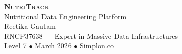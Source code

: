 \documentclass[aspectratio=169, 10pt]{beamer}
\title{\nutritrack}
\subtitle{Nutritional Data Engineering Platform}
\author{Reetika Gautam}
\date{March 2026}
\institute{%
  RNCP37638 --- Expert in Massive Data Infrastructures\\
  Level 7 (Master's equivalent) \quad\textbullet\quad Simplon.co
}
\newcommand{\nutritrack}{\textsc{NutriTrack}}
\begin{document}
\begin{frame}[standout]
  \vspace{1.5cm}

  {\Huge\bfseries \nutritrack}\\[0.3cm]
  {\large Nutritional Data Engineering Platform}\\[0.8cm]
  {\normalsize Reetika Gautam}\\[0.2cm]
  {\small RNCP37638 --- Expert in Massive Data Infrastructures}\\
  {\small Level 7 $\bullet$ March 2026 $\bullet$ Simplon.co}
\end{frame}
\end{document}
